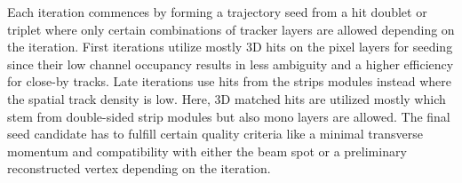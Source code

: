 
Each iteration commences by forming a trajectory seed from a hit doublet or triplet where only certain combinations of tracker layers are allowed depending on the iteration. First iterations utilize mostly 3D hits on the pixel layers for seeding since their low channel occupancy results in less ambiguity and a higher efficiency for close-by tracks. Late iterations use hits from the strips modules instead where the spatial track density is low. Here, 3D matched hits are utilized mostly which stem from double-sided strip modules but also mono layers are allowed. The final seed candidate has to fulfill certain quality criteria like a minimal transverse momentum and compatibility with either the beam spot or a preliminary reconstructed vertex depending on the iteration.

